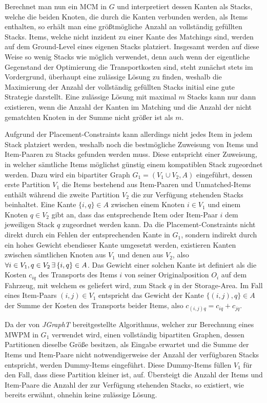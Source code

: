Berechnet man nun ein \textsc{MCM} in $G$ und interpretiert dessen Kanten als Stacks, welche die beiden Knoten, die durch
die Kanten verbunden werden, als Items enthalten, so erhält man eine größtmögliche Anzahl an vollständig gefüllten Stacks.
Items, welche nicht inzident zu einer Kante des Matchings sind, werden auf dem Ground-Level eines eigenen Stacks platziert.
Insgesamt werden auf diese Weise so wenig Stacks wie möglich verwendet, denn auch wenn der eigentliche Gegenstand der Optimierung die Transportkosten sind, steht zunächst stets im Vordergrund, überhaupt eine zulässige Lösung zu finden, weshalb die Maximierung der Anzahl der vollständig gefüllten Stacks initial eine gute Strategie darstellt.
Eine zulässige Lösung mit maximal $m$ Stacks kann nur dann existieren, wenn die Anzahl der Kanten im Matching und die Anzahl der nicht gematchten Knoten in der Summe nicht größer ist als $m$.

Aufgrund der Placement-Constraints kann allerdings nicht jedes Item in jedem Stack platziert werden, weshalb noch die bestmögliche Zuweisung von
Items und Item-Paaren zu Stacks gefunden werden muss. Diese entspricht einer Zuweisung, in welcher sämtliche Items möglichst günstig einem
kompatiblen Stack zugeordnet werden. Dazu wird ein bipartiter Graph $G_1 = (V_1 \cup V_2, A)$ eingeführt, dessen erste Partition $V_1$ die Items bestehend aus Item-Paaren und Unmatched-Items enthält während die zweite Partition $V_2$ die zur Verfügung stehenden Stacks beinhaltet.
Eine Kante $\{i, q\} \in A$ zwischen einem Knoten $i \in V_1$ und einem Knoten $q \in V_2$ gibt an, dass das entsprechende Item oder Item-Paar $i$ dem jeweiligen Stack $q$ zugeordnet werden kann. Da die Placement-Constraints nicht direkt durch ein Fehlen der entsprechenden Kante in $G_1$, sondern indirekt durch ein hohes Gewicht ebendieser Kante umgesetzt werden, existieren Kanten zwischen sämtlichen Knoten
aus $V_1$ und denen aus $V_2$, also $\forall i \in V_1, q \in V_2 \thinspace \exists \thinspace \{i, q\} \in A$.
Das Gewicht einer solchen Kante ist definiert als die Kosten $c_{iq}$ des Transports des Items $i$ von seiner Originalposition $O_i$ auf dem Fahrzeug, mit welchem es geliefert wird, zum Stack $q$
in der Storage-Area. Im Fall eines Item-Paars $(i, j) \in V_1$ entspricht das
Gewicht der Kante $\{(i, j), q\} \in A$ der Summe der Kosten des Transports beider Items, also $c_{(i, j)q} = c_{iq} + c_{jq}$.

Da der von \textit{JGraphT} bereitgestellte Algorithmus, welcher zur Berechnung eines \textsc{MWPM} in $G_1$ verwendet wird,
einen vollständig bipartiten Graphen, dessen Partitionen dieselbe Größe besitzen, als Eingabe erwartet und die Summe der Items und Item-Paare
nicht notwendigerweise der Anzahl der verfügbaren Stacks entspricht, werden Dummy-Items eingeführt.
Diese Dummy-Items füllen $V_1$ für den Fall, dass diese Partition kleiner ist, auf.
Übersteigt die Anzahl der Items und Item-Paare die Anzahl der zur Verfügung stehenden Stacks, so existiert,
wie bereits erwähnt, ohnehin keine zulässige Lösung.

